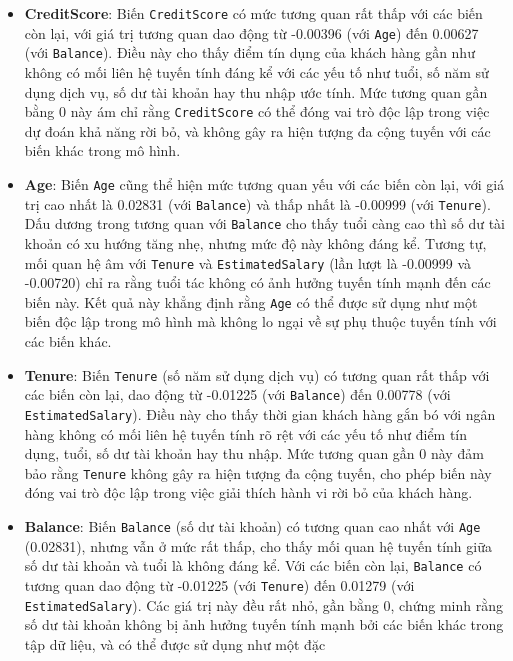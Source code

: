 \documentclass[
]{article}
\begin{document}
\begin{itemize}
\item
  \textbf{CreditScore}: Biến \texttt{CreditScore} có mức tương quan rất
  thấp với các biến còn lại, với giá trị tương quan dao động từ -0.00396
  (với \texttt{Age}) đến 0.00627 (với \texttt{Balance}). Điều này cho
  thấy điểm tín dụng của khách hàng gần như không có mối liên hệ tuyến
  tính đáng kể với các yếu tố như tuổi, số năm sử dụng dịch vụ, số dư
  tài khoản hay thu nhập ước tính. Mức tương quan gần bằng 0 này ám chỉ
  rằng \texttt{CreditScore} có thể đóng vai trò độc lập trong việc dự
  đoán khả năng rời bỏ, và không gây ra hiện tượng đa cộng tuyến với các
  biến khác trong mô hình.
\item
  \textbf{Age}: Biến \texttt{Age} cũng thể hiện mức tương quan yếu với
  các biến còn lại, với giá trị cao nhất là 0.02831 (với
  \texttt{Balance}) và thấp nhất là -0.00999 (với \texttt{Tenure}). Dấu
  dương trong tương quan với \texttt{Balance} cho thấy tuổi càng cao thì
  số dư tài khoản có xu hướng tăng nhẹ, nhưng mức độ này không đáng kể.
  Tương tự, mối quan hệ âm với \texttt{Tenure} và
  \texttt{EstimatedSalary} (lần lượt là -0.00999 và -0.00720) chỉ ra
  rằng tuổi tác không có ảnh hưởng tuyến tính mạnh đến các biến này. Kết
  quả này khẳng định rằng \texttt{Age} có thể được sử dụng như một biến
  độc lập trong mô hình mà không lo ngại về sự phụ thuộc tuyến tính với
  các biến khác.
\item
  \textbf{Tenure}: Biến \texttt{Tenure} (số năm sử dụng dịch vụ) có
  tương quan rất thấp với các biến còn lại, dao động từ -0.01225 (với
  \texttt{Balance}) đến 0.00778 (với \texttt{EstimatedSalary}). Điều này
  cho thấy thời gian khách hàng gắn bó với ngân hàng không có mối liên
  hệ tuyến tính rõ rệt với các yếu tố như điểm tín dụng, tuổi, số dư tài
  khoản hay thu nhập. Mức tương quan gần 0 này đảm bảo rằng
  \texttt{Tenure} không gây ra hiện tượng đa cộng tuyến, cho phép biến
  này đóng vai trò độc lập trong việc giải thích hành vi rời bỏ của
  khách hàng.
\item
  \textbf{Balance}: Biến \texttt{Balance} (số dư tài khoản) có tương
  quan cao nhất với \texttt{Age} (0.02831), nhưng vẫn ở mức rất thấp,
  cho thấy mối quan hệ tuyến tính giữa số dư tài khoản và tuổi là không
  đáng kể. Với các biến còn lại, \texttt{Balance} có tương quan dao động
  từ -0.01225 (với \texttt{Tenure}) đến 0.01279 (với
  \texttt{EstimatedSalary}). Các giá trị này đều rất nhỏ, gần bằng 0,
  chứng minh rằng số dư tài khoản không bị ảnh hưởng tuyến tính mạnh bởi
  các biến khác trong tập dữ liệu, và có thể được sử dụng như một đặc

\end{itemize}
\end{document}
